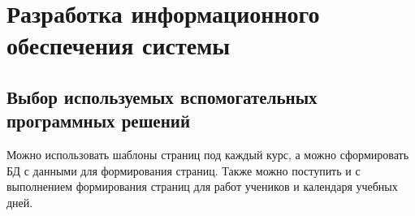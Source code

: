 \section{Разработка информационного обеспечения системы}

\subsection{Выбор используемых вспомогательных программных решений}






Можно использовать шаблоны страниц под каждый курс, а можно сформировать БД с данными для формирования страниц.
Также можно поступить и с выполнением формирования страниц для работ учеников и календаря учебных дней.







\clearpage
